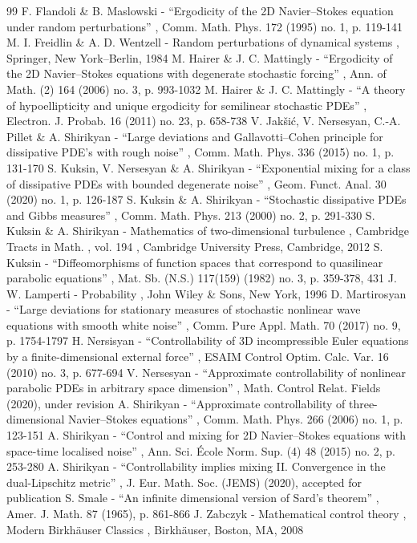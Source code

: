 \documentclass[11pt]{article}
\theoremstyle{plain}
\theoremstyle{definition}
\begin{document}
\begin{thebibliography}{99}
 F. Flandoli \& B. Maslowski - “Ergodicity of the 2D Navier–Stokes equation under random perturbations” , Comm. Math. Phys. 172 (1995) no. 1, p. 119-141
 M. I. Freidlin \& A. D. Wentzell - Random perturbations of dynamical systems , Springer, New York–Berlin, 1984
 M. Hairer \& J. C. Mattingly - “Ergodicity of the 2D Navier–Stokes equations with degenerate stochastic forcing” , Ann. of Math. (2) 164 (2006) no. 3, p. 993-1032
 M. Hairer \& J. C. Mattingly - “A theory of hypoellipticity and unique ergodicity for semilinear stochastic PDEs” , Electron. J. Probab. 16 (2011) no. 23, p. 658-738
 V. Jakšić, V. Nersesyan, C.-A. Pillet \& A. Shirikyan - “Large deviations and Gallavotti–Cohen principle for dissipative PDE’s with rough noise” , Comm. Math. Phys. 336 (2015) no. 1, p. 131-170
 S. Kuksin, V. Nersesyan \& A. Shirikyan - “Exponential mixing for a class of dissipative PDEs with bounded degenerate noise” , Geom. Funct. Anal. 30 (2020) no. 1, p. 126-187
 S. Kuksin \& A. Shirikyan - “Stochastic dissipative PDEs and Gibbs measures” , Comm. Math. Phys. 213 (2000) no. 2, p. 291-330
 S. Kuksin \& A. Shirikyan - Mathematics of two-dimensional turbulence , Cambridge Tracts in Math. , vol. 194 , Cambridge University Press, Cambridge, 2012
 S. Kuksin - “Diffeomorphisms of function spaces that correspond to quasilinear parabolic equations” , Mat. Sb. (N.S.) 117(159) (1982) no. 3, p. 359-378, 431
 J. W. Lamperti - Probability , John Wiley \& Sons, New York, 1996
 D. Martirosyan - “Large deviations for stationary measures of stochastic nonlinear wave equations with smooth white noise” , Comm. Pure Appl. Math. 70 (2017) no. 9, p. 1754-1797
 H. Nersisyan - “Controllability of 3D incompressible Euler equations by a finite-dimensional external force” , ESAIM Control Optim. Calc. Var. 16 (2010) no. 3, p. 677-694
 V. Nersesyan - “Approximate controllability of nonlinear parabolic PDEs in arbitrary space dimension” , Math. Control Relat. Fields (2020), under revision
 A. Shirikyan - “Approximate controllability of three-dimensional Navier–Stokes equations” , Comm. Math. Phys. 266 (2006) no. 1, p. 123-151
 A. Shirikyan - “Control and mixing for 2D Navier–Stokes equations with space-time localised noise” , Ann. Sci. École Norm. Sup. (4) 48 (2015) no. 2, p. 253-280
 A. Shirikyan - “Controllability implies mixing II. Convergence in the dual-Lipschitz metric” , J. Eur. Math. Soc. (JEMS) (2020), accepted for publication
 S. Smale - “An infinite dimensional version of Sard’s theorem” , Amer. J. Math. 87 (1965), p. 861-866
 J. Zabczyk - Mathematical control theory , Modern Birkhäuser Classics , Birkhäuser, Boston, MA, 2008
\end{thebibliography}
\end{document}
